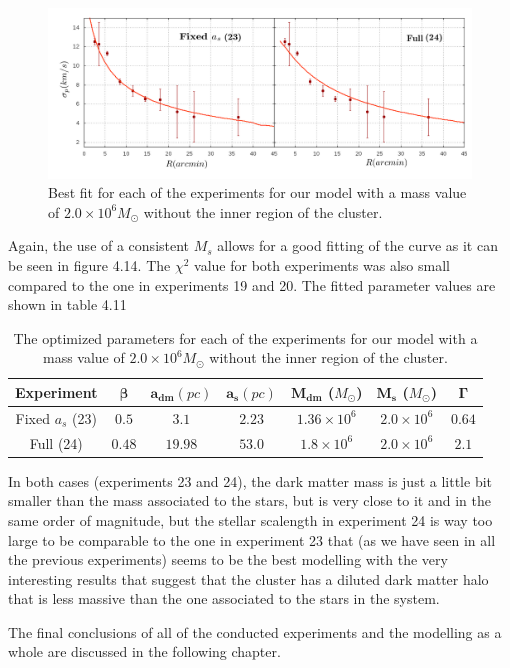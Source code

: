 \begin{figure}[H]
\centering
\includegraphics[width=15cm]{images/Starlight_25_10_1.png}
\caption[Best fits for our model with a mass value based on the Starlight procedures without the inner region.]{Best fit for each of the experiments for our model with a mass value of $2.0 \times 10^{6} M_{\odot}$ without the inner region of the cluster.}
\end{figure}

Again, the use of a consistent $M_s$ allows for a good fitting of the curve as it can be seen in figure 4.14. The $\chi^{2}$ value for both experiments was also small compared to the one in experiments 19 and 20. The fitted parameter values are shown in table 4.11

\begin{table}[H]
\centering
\begin{tabular}{| c| c| c| c| c| c| c|}
    \hline
    \textbf{Experiment} & $\mathbf{\beta}$ & $\mathbf{a_{dm}} (pc)$ & $\mathbf{a_{s}} (pc)$ & $\mathbf{M_{dm}}$ ($M_{\odot}$) & $\mathbf{M_{s}}$ ($M_{\odot}$) & $\mathbf{\Gamma}$\\ \hline
	Fixed $a_s$ (23) &	$0.5$ &	$3.1$ &	$\mathbf{2.23}$ &	$1.36 \times 10^{6}$ &	$2.0 \times 10 ^{6}$ &	$0.64$\\ \hline
	Full (24) &	$0.48$ &	$19.98$ &	$53.0$ &	$1.8 \times 10^{6}$ &	$2.0 \times 10^{6}$ &	$2.1$\\ \hline
  \end{tabular} 
\caption[Optimized parameters for our model with a mass value based on the Starlight procedures without the inner region.]{The optimized parameters for each of the experiments for our model with a mass value of $2.0 \times 10^{6} M_{\odot}$ without the inner region of the cluster.} 
\end{table}

In both cases (experiments 23 and 24), the dark matter mass is just a little bit smaller than the mass associated to the stars, but is very close to it and in the same order of magnitude, but the stellar scalength in experiment 24 is way too large to be comparable to the one in experiment 23 that (as we have seen in all the previous experiments) seems to be the best modelling with the very interesting results that suggest that the cluster has a diluted dark matter halo that is less massive than the one associated to the stars in the system.

 The final conclusions of all of the conducted experiments and the modelling as a whole are discussed in the following chapter.